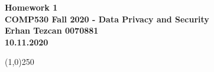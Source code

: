 \documentclass[12pt,reqno]{amsart}
\begin{document}
\begin{center}
\large\textbf{Homework 1 \\ COMP530 Fall 2020 - Data Privacy and Security \\}
\normalsize\textbf{ Erhan Tezcan 0070881 \\ 10.11.2020} \\
\end{center}

\begin{center}
\line(1,0){250}
\end{center}

%
%
\end{document}
